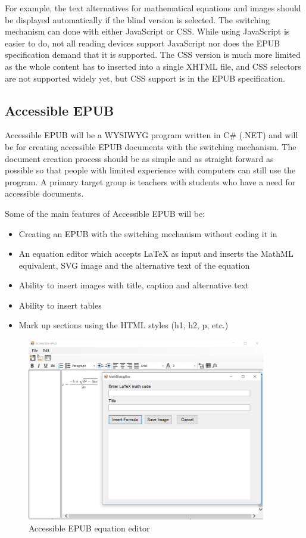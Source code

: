 \documentclass{llncs}
\begin{document}
For example, the text alternatives for mathematical equations and images should be displayed automatically if the blind version is selected.\cite{EPUB3bp} The switching mechanism can done with either JavaScript or CSS. While using JavaScript is easier to do, not all reading devices support JavaScript nor does the EPUB specification demand that it is supported. \cite{EPUB3bp} The CSS version is much more limited as the whole content has to inserted into a single XHTML file, and CSS selectors are not supported widely yet, but CSS support is in the EPUB specification.

\subsection{Accessible EPUB}
Accessible EPUB will be a WYSIWYG program written in C\# (.NET) and will be for creating accessible EPUB documents with the switching mechanism. The document creation process should be as simple and as straight forward as possible so that people with limited experience with computers can still use the program. A primary target group is teachers with students who have a need for accessible documents.

Some of the main features of Accessible EPUB will be:

\begin{itemize}
	\item Creating an EPUB with the switching mechanism without coding it in
	\item An equation editor which accepts LaTeX as input and inserts the MathML equivalent, SVG image and the alternative text of the equation
	\item Ability to insert images with title, caption and alternative text
	\item Ability to insert tables
	\item Mark up sections using the HTML styles (h1, h2, p, etc.)
\end{itemize}



\begin{figure}
	\centering
	\includegraphics[height=80mm]{AccessibleEPUBequation.png}
	\caption{Accessible EPUB equation editor}
\end{figure}
\end{document}
